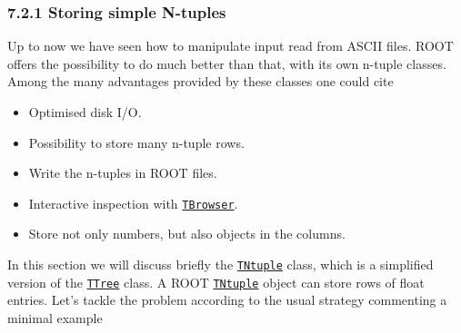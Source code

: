 \documentclass{article}
\begin{document}
\subsubsection{7.2.1 Storing simple
N-tuples}\label{storing-simple-n-tuples}

Up to now we have seen how to manipulate input read from ASCII files.
ROOT offers the possibility to do much better than that, with its own
n-tuple classes. Among the many advantages provided by these classes one
could cite

\begin{itemize}
\item
  Optimised disk I/O.
\item
  Possibility to store many n-tuple rows.
\item
  Write the n-tuples in ROOT files.
\item
  Interactive inspection with
  \href{https://root.cern.ch/doc/master/classTBrowser.html}{\texttt{TBrowser}}.
\item
  Store not only numbers, but also objects in the columns.
\end{itemize}

In this section we will discuss briefly the
\href{https://root.cern.ch/doc/v606/classTNtuple.html}{\texttt{TNtuple}}
class, which is a simplified version of the
\href{https://root.cern.ch/doc/v606/classTTree.html}{\texttt{TTree}}
class. A ROOT
\href{https://root.cern.ch/doc/v606/classTNtuple.html}{\texttt{TNtuple}}
object can store rows of float entries. Let's tackle the problem
according to the usual strategy commenting a minimal example
\end{document}
